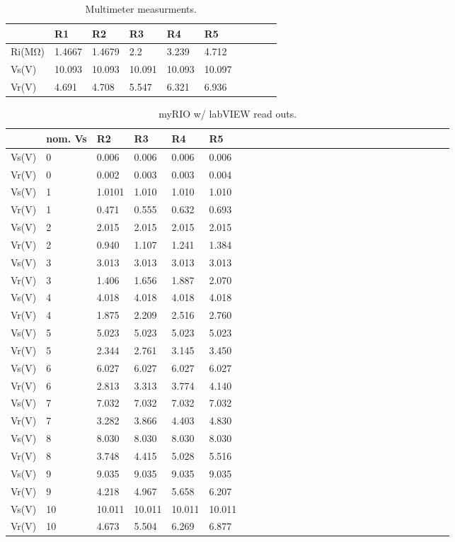 \documentclass[10pt,twocolumn]{article}
\begin{document}
 
\begin{table}
	\begin{tabularx}{1\linewidth}{ lXXXXX|cXXX }
		\hline
		 & \textbf{R1} & \textbf{R2} & \textbf{R3} & \textbf{R4} & \textbf{R5}\\
		\hline
		Ri(MΩ) & 1.4667 & 1.4679 & 2.2 & 3.239 & 4.712 \\
		\cline{1-6}
		Vs(V) & 10.093 & 10.093 & 10.091 & 10.093 & 10.097 \\
		\cline{1-6}
		Vr(V) & 4.691 & 4.708 & 5.547 & 6.321 & 6.936 \\
		\hline
	\end{tabularx}
	\caption{Multimeter measurments.}
	\label{tab:Tab1}
\end{table}

\begin{table}
	\begin{tabularx}{1\linewidth}{ lXXXXX|cXXXXXXXXXXXXXXXXXXXX }
		\hline
		 & \textbf{nom. Vs} & \textbf{R2} & \textbf{R3} & \textbf{R4} & \textbf{R5}\\
		\hline
		Vs(V) & 0 & 0.006 & 0.006 & 0.006 & 0.006 \\
		Vr(V) & 0 & 0.002 & 0.003 & 0.003 & 0.004 \\
		\cline{1-6}
		Vs(V) & 1 & 1.0101 & 1.010 & 1.010 & 1.010 \\
		Vr(V) & 1 & 0.471 & 0.555 & 0.632 & 0.693 \\
		\cline{1-6}
		Vs(V) & 2 & 2.015 & 2.015 & 2.015 & 2.015 \\
		Vr(V) & 2 & 0.940 & 1.107 & 1.241 & 1.384 \\
		\cline{1-6}
		Vs(V) & 3 & 3.013 & 3.013 & 3.013 & 3.013 \\
		Vr(V) & 3 & 1.406 & 1.656 & 1.887 & 2.070 \\
		\cline{1-6}
		Vs(V) & 4 & 4.018 & 4.018 & 4.018 & 4.018 \\
		Vr(V) & 4 & 1.875 & 2.209 & 2.516 & 2.760 \\
		\cline{1-6}
		Vs(V) & 5 & 5.023 & 5.023 & 5.023 & 5.023 \\
		Vr(V) & 5 & 2.344 & 2.761 & 3.145 & 3.450 \\
		\cline{1-6}
		Vs(V) & 6 & 6.027 & 6.027 & 6.027 & 6.027 \\
		Vr(V) & 6 & 2.813 & 3.313 & 3.774 & 4.140 \\
		\cline{1-6}
		Vs(V) & 7 & 7.032 & 7.032 & 7.032 & 7.032 \\
		Vr(V) & 7 & 3.282 & 3.866 & 4.403 & 4.830 \\
		\cline{1-6}
		Vs(V) & 8 & 8.030 & 8.030 & 8.030 & 8.030 \\
		Vr(V) & 8 & 3.748 & 4.415 & 5.028 & 5.516 \\
		\cline{1-6}
		Vs(V) & 9 & 9.035 & 9.035 & 9.035 & 9.035 \\
		Vr(V) & 9 & 4.218 & 4.967 & 5.658 & 6.207 \\
		\cline{1-6}
		Vs(V) & 10 & 10.011 & 10.011 & 10.011 & 10.011 \\
		Vr(V) & 10 & 4.673 & 5.504 & 6.269 & 6.877 \\
		\hline
	\end{tabularx}
	\caption{myRIO w/ labVIEW read outs.}
	\label{tab:Tab2}
\end{table}
\end{document}
